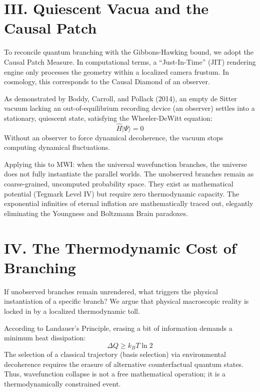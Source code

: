 \documentclass[aps,prd,reprint,superscriptaddress,nofootinbib]{revtex4-2}
\begin{document}
\section{III. Quiescent Vacua and the Causal Patch}

To reconcile quantum branching with the Gibbons-Hawking bound, we adopt the Causal Patch Measure. In computational terms, a ``Just-In-Time'' (JIT) rendering engine only processes the geometry within a localized camera frustum. In cosmology, this corresponds to the Causal Diamond of an observer.

As demonstrated by Boddy, Carroll, and Pollack (2014), an empty de Sitter vacuum lacking an out-of-equilibrium recording device (an observer) settles into a stationary, quiescent state, satisfying the Wheeler-DeWitt equation:
\begin{equation}
\hat{H} |\Psi\rangle = 0
\end{equation}
Without an observer to force dynamical decoherence, the vacuum stops computing dynamical fluctuations. 

Applying this to MWI: when the universal wavefunction branches, the universe does not fully instantiate the parallel worlds. The unobserved branches remain as coarse-grained, uncomputed probability space. They exist as mathematical potential (Tegmark Level IV) but require zero thermodynamic capacity. The exponential infinities of eternal inflation are mathematically traced out, elegantly eliminating the Youngness and Boltzmann Brain paradoxes.

\section{IV. The Thermodynamic Cost of Branching}

If unobserved branches remain unrendered, what triggers the physical instantiation of a specific branch? We argue that physical macroscopic reality is locked in by a localized thermodynamic toll. 

According to Landauer's Principle, erasing a bit of information demands a minimum heat dissipation:
\begin{equation}
\Delta Q \ge k_B T \ln 2
\end{equation}
The selection of a classical trajectory (basis selection) via environmental decoherence requires the erasure of alternative counterfactual quantum states. Thus, wavefunction collapse is not a free mathematical operation; it is a thermodynamically constrained event.
\end{document}
